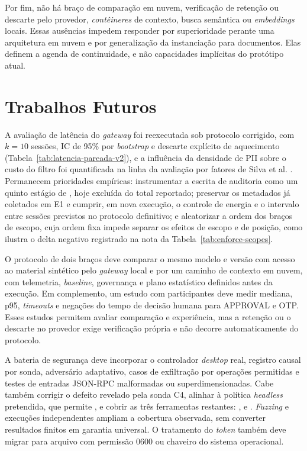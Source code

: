 \documentclass[12pt,openright,twoside,a4paper,english,brazil]{abntex2}
\begin{document}
Por fim, não há braço de comparação em nuvem, verificação de retenção ou descarte pelo provedor, \textit{contêineres} de contexto, busca semântica ou \textit{embeddings} locais. Essas ausências impedem responder por superioridade perante uma arquitetura em nuvem e por generalização da instanciação para documentos. Elas definem a agenda de continuidade, e não capacidades implícitas do protótipo atual.

\section{Trabalhos Futuros}
A avaliação de latência do \textit{gateway} foi reexecutada sob protocolo corrigido, com $k=10$ sessões, IC de 95\% por \textit{bootstrap} e descarte explícito de aquecimento (Tabela~\ref{tab:latencia-pareada-v2}), e a influência da densidade de PII sobre o custo do filtro foi quantificada na linha da avaliação por fatores de Silva et al. \cite{silva2016}. Permanecem prioridades empíricas: instrumentar a escrita de auditoria como um quinto estágio de , hoje excluída do total reportado; preservar os metadados já coletados em E1 e cumprir, em nova execução, o controle de energia e o intervalo entre sessões previstos no protocolo definitivo; e aleatorizar a ordem dos braços de escopo, cuja ordem fixa impede separar os efeitos de escopo e de posição, como ilustra o delta negativo registrado na nota da Tabela~\ref{tab:enforce-scopes}.

O protocolo de dois braços deve comparar o mesmo modelo e versão com acesso ao material sintético pelo \textit{gateway} local e por um caminho de contexto em nuvem, com telemetria, \textit{baseline}, governança e plano estatístico definidos antes da execução. Em complemento, um estudo com participantes deve medir mediana, p95, \textit{timeouts} e negações do tempo de decisão humana para APPROVAL e OTP. Esses estudos permitem avaliar comparação e experiência, mas a retenção ou o descarte no provedor exige verificação própria e não decorre automaticamente do protocolo.

A bateria de segurança deve incorporar o controlador \textit{desktop} real, registro causal por sonda, adversário adaptativo, casos de exfiltração por operações permitidas e testes de entradas JSON-RPC malformadas ou superdimensionadas. Cabe também corrigir o defeito revelado pela sonda C4, alinhar  à política \textit{headless} pretendida, que permite , e cobrir as três ferramentas restantes: ,  e . \textit{Fuzzing} e execuções independentes ampliam a cobertura observada, sem converter resultados finitos em garantia universal. O tratamento do \textit{token} também deve migrar para arquivo com permissão 0600 ou chaveiro do sistema operacional.
\end{document}
